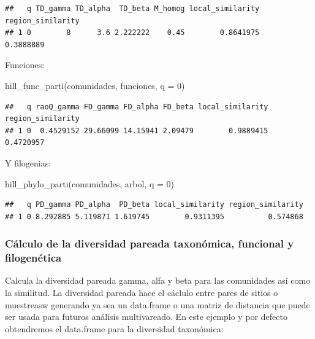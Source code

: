 \documentclass[
]{article}
\newenvironment{Shaded}{\begin{snugshade}}{\end{snugshade}}
\newcommand{\AttributeTok}[1]{\textcolor[rgb]{0.77,0.63,0.00}{#1}}
\newcommand{\DecValTok}[1]{\textcolor[rgb]{0.00,0.00,0.81}{#1}}
\newcommand{\FunctionTok}[1]{\textcolor[rgb]{0.00,0.00,0.00}{#1}}
\newcommand{\NormalTok}[1]{#1}
\begin{document}
\begin{verbatim}
##   q TD_gamma TD_alpha  TD_beta M_homog local_similarity region_similarity
## 1 0        8      3.6 2.222222    0.45        0.8641975         0.3888889
\end{verbatim}

\hfill\break
Funciones:

\begin{Shaded}
\begin{Highlighting}[]
\FunctionTok{hill\_func\_parti}\NormalTok{(comunidades, funciones, }\AttributeTok{q =} \DecValTok{0}\NormalTok{)}
\end{Highlighting}
\end{Shaded}

\begin{verbatim}
##   q raoQ_gamma FD_gamma FD_alpha FD_beta local_similarity region_similarity
## 1 0  0.4529152 29.66099 14.15941 2.09479        0.9889415         0.4720957
\end{verbatim}

\hfill\break
Y filogenias:

\begin{Shaded}
\begin{Highlighting}[]
\FunctionTok{hill\_phylo\_parti}\NormalTok{(comunidades, arbol, }\AttributeTok{q =} \DecValTok{0}\NormalTok{)}
\end{Highlighting}
\end{Shaded}

\begin{verbatim}
##   q PD_gamma PD_alpha  PD_beta local_similarity region_similarity
## 1 0 8.292885 5.119871 1.619745        0.9311395          0.574868
\end{verbatim}

\hfill\break

\hypertarget{cuxe1lculo-de-la-diversidad-pareada-taxonuxf3mica-funcional-y-filogenuxe9tica}{%
\subsubsection{Cálculo de la diversidad pareada taxonómica, funcional y
filogenética}\label{cuxe1lculo-de-la-diversidad-pareada-taxonuxf3mica-funcional-y-filogenuxe9tica}}

Calcula la diversidad pareada gamma, alfa y beta para las comunidades
así como la similitud. La diversidad pareada hace el cáclulo entre pares
de sitios o muestreasw generando ya sea un data.frame o una matriz de
distancia que puede ser usada para futuros análisis multivareado. En
este ejemplo y por defecto obtendremos el data.frame para la diversidad
taxonómica:\\
\end{document}
